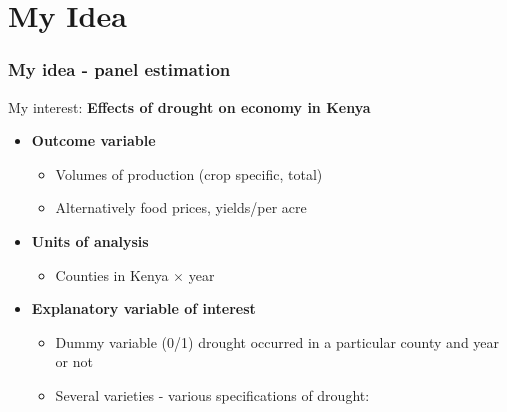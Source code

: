 \documentclass{beamer}              %
\begin{document}



\section{My Idea}


\begin{frame}

\frametitle{My idea - panel estimation}\label{MySuggestion} 

My interest: \textbf{Effects of drought on economy in Kenya}
\begin{itemize}

\item \textbf{Outcome variable}

\begin{itemize}
\item Volumes of production (crop specific, total)
\item Alternatively food prices, yields/per acre
\end{itemize}

\item \textbf{Units of analysis}
\begin{itemize}
\item Counties in Kenya $\times$ year
\
\end{itemize}


\item \textbf{Explanatory variable of interest}

\begin{itemize}
\item Dummy variable (0/1) drought occurred in a particular county and year or not
\item Several varieties - various specifications of drought:

\end{itemize}


\end{itemize}

\end{frame}
\end{document}
